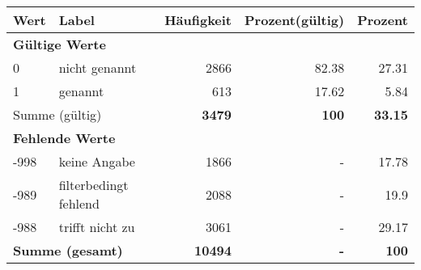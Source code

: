      \begin{longtable}{lXrrr}
     \toprule
     \textbf{Wert} & \textbf{Label} & \textbf{Häufigkeit} & \textbf{Prozent(gültig)} & \textbf{Prozent} \\
     \endhead
     \midrule
     \multicolumn{5}{l}{\textbf{Gültige Werte}}\\

     0 &
     \multicolumn{1}{X}{ nicht genannt   } &


       \num{2866} &
       \num[round-mode=places,round-precision=2]{82.38} &
         \num[round-mode=places,round-precision=2]{27.31} \\

     1 &
     \multicolumn{1}{X}{ genannt   } &


       \num{613} &
       \num[round-mode=places,round-precision=2]{17.62} &
         \num[round-mode=places,round-precision=2]{5.84} \\
     \midrule
     \multicolumn{2}{l}{Summe (gültig)} &
       \textbf{\num{3479}} &
     \textbf{\num{100}} &
       \textbf{\num[round-mode=places,round-precision=2]{33.15}} \\
     \multicolumn{5}{l}{\textbf{Fehlende Werte}}\\
       -998 &
       keine Angabe &
         \num{1866} &
        - &
         \num[round-mode=places,round-precision=2]{17.78} \\
       -989 &
       filterbedingt fehlend &
         \num{2088} &
        - &
         \num[round-mode=places,round-precision=2]{19.9} \\
       -988 &
       trifft nicht zu &
         \num{3061} &
        - &
         \num[round-mode=places,round-precision=2]{29.17} \\
     \midrule
     \multicolumn{2}{l}{\textbf{Summe (gesamt)}} &
          \textbf{\num{10494}} &
        \textbf{-} &
        \textbf{\num{100}} \\
     \bottomrule
     \end{longtable}
     
